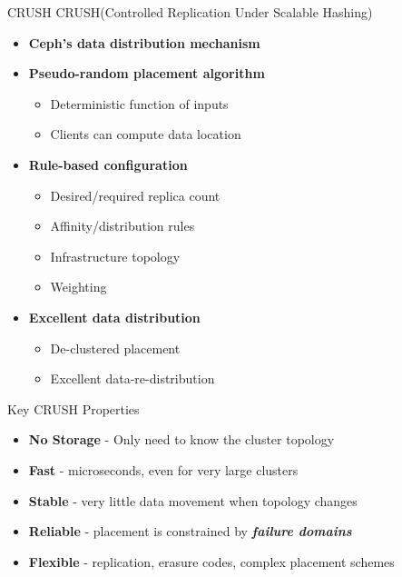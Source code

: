 \begin{frame}{CRUSH}
    CRUSH(Controlled Replication Under Scalable Hashing)
    \begin{itemize}
        \item \textbf{Ceph's data distribution mechanism}
        \item \textbf{Pseudo-random placement algorithm}
            \begin{itemize}
                \item Deterministic function of inputs
                \item Clients can compute data location
            \end{itemize}
        \item \textbf{Rule-based configuration}
            \begin{itemize}
                \item Desired/required replica count
                \item Affinity/distribution rules
                \item Infrastructure topology
                \item Weighting
            \end{itemize}
        \item \textbf{Excellent data distribution}
            \begin{itemize}
                \item De-clustered placement
                \item Excellent data-re-distribution
            \end{itemize}
    \end{itemize}
\end{frame}

\begin{frame}{Key CRUSH Properties}
    \begin{itemize}
        \item \textbf{No Storage} - Only need to know the cluster topology
        \item \textbf{Fast} - microseconds, even for very large clusters
        \item \textbf{Stable} - very little data movement when topology changes
        \item \textbf{Reliable} - placement is constrained by \textbf{\textit{failure domains}}
        \item \textbf{Flexible} - replication, erasure codes, complex placement schemes
    \end{itemize}
\end{frame}

